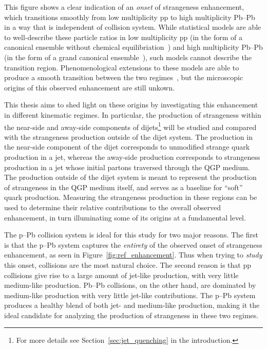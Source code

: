 This figure shows a clear indication of an \textit{onset} of strangeness enhancement, which transitions smoothly from low multiplicity pp to high multiplicity Pb--Pb in a way that is independent of collision system. While statistical models are able to well-describe these particle ratios in low multiplicity pp (in the form of a canonical ensemble without chemical equilibriation~\cite{NATURE15, NATURE16}) and high multiplicity Pb--Pb (in the form of a grand canonical ensemble~\cite{NATURE16}), such models cannot describe the transition region. Phenomenological extensions to these models are able to produce a smooth transition between the two regimes~\cite{NATURE18, NATURE19}, but the microscopic origins of this observed enhancement are still unkown. 

This thesis aims to shed light on these origins by investigating this enhancement in different kinematic regimes. In particular, the production of strangeness within the near-side and away-side components of dijets\footnote{For more details see Section~\ref{sec:jet_quenching} in the introduction.} will be studied and compared with the strangeness production outside of the dijet system. The production in the near-side component of the dijet corresponds to unmodified strange quark production in a jet, whereas the away-side production corresponds to strangeness production in a jet whose initial partons traversed through the QGP medium. The production outside of the dijet system is meant to represent the production of strangeness in the QGP medium itself, and serves as a baseline for ``soft'' quark production. Measuring the strangeness production in these regions can be used to determine their relative contributions to the overall observed enhancement, in turn illuminating some of its origins at a fundamental level.

The p--Pb collision system is ideal for this study for two major reasons. The first is that the p--Pb system captures the \textit{entirety} of the observed onset of strangeness enhancement, as seen in Figure~\ref{fig:ref_enhancement}. Thus when trying to \textit{study} this onset, \pPb collisions are the most natural choice. The second reason is that pp collisions give rise to a large amount of jet-like production, with very little medium-like production. Pb--Pb collisions, on the other hand, are dominated by medium-like production with very little jet-like contributions. The p--Pb system produces a healthy blend of both jet- and medium-like production, making it the ideal candidate for analyzing the production of strangeness in these two regimes.

